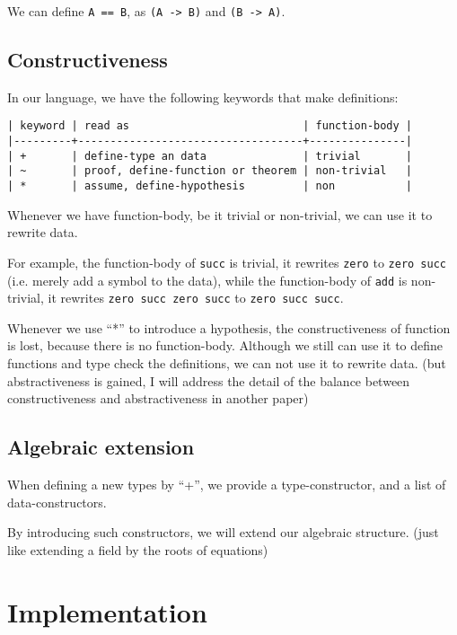 \documentclass[numbers]{sigplanconf}
\begin{document}
We can define {\scriptsize\verb|A == B|}, as {\scriptsize\verb|(A -> B)|} and {\scriptsize\verb|(B -> A)|}.

\subsection{Constructiveness}

In our language, we have the following keywords that make definitions:

{\scriptsize\begin{verbatim}
| keyword | read as                           | function-body |
|---------+-----------------------------------+---------------|
| +       | define-type an data               | trivial       |
| ~       | proof, define-function or theorem | non-trivial   |
| *       | assume, define-hypothesis         | non           |
\end{verbatim}}

Whenever we have function-body, be it trivial or non-trivial,
we can use it to rewrite data.

For example,
the function-body of {\scriptsize\verb|succ|} is trivial,
it rewrites {\scriptsize\verb|zero|} to {\scriptsize\verb|zero succ|} (i.e. merely add a symbol to the data),
while the function-body of {\scriptsize\verb|add|} is non-trivial,
it rewrites {\scriptsize\verb|zero succ zero succ|} to {\scriptsize\verb|zero succ succ|}.

Whenever we use ``*'' to introduce a hypothesis,
the constructiveness of function is lost, because there is no function-body.
Although we still can use it to define functions
and type check the definitions,
we can not use it to rewrite data.
(but abstractiveness is gained,
I will address the detail of the balance
between constructiveness and abstractiveness in another paper)

\subsection{Algebraic extension}

When defining a new types by ``+'',
we provide a type-constructor,
and a list of data-constructors.

By introducing such constructors,
we will extend our algebraic structure.
(just like extending a field by the roots of equations)

\newpage

\section{Implementation}
\end{document}
